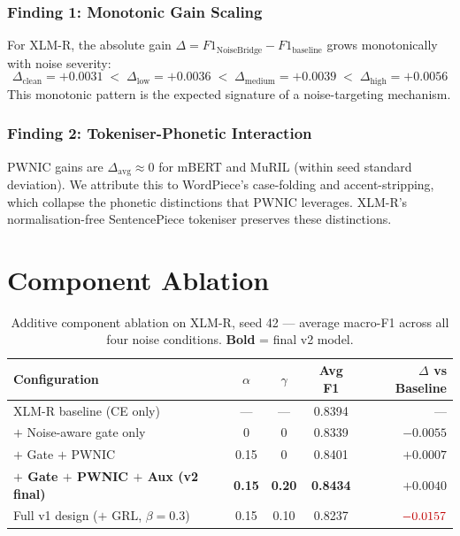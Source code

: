 \documentclass[12pt,a4paper]{report}
\begin{document}
\subsubsection{Finding 1: Monotonic Gain Scaling}
For XLM-R, the absolute gain $\Delta = F1_{\text{NoiseBridge}} - F1_{\text{baseline}}$ grows monotonically with noise severity:
\begin{equation}
  \Delta_{\text{clean}} = +0.0031 \;<\; \Delta_{\text{low}} = +0.0036 \;<\; \Delta_{\text{medium}} = +0.0039 \;<\; \Delta_{\text{high}} = +0.0056
  \label{eq:delta_monotone}
\end{equation}
This monotonic pattern is the expected signature of a noise-targeting mechanism.

\subsubsection{Finding 2: Tokeniser-Phonetic Interaction}
PWNIC gains are $\Delta_{\text{avg}} \approx 0$ for mBERT and MuRIL (within seed standard deviation). We attribute this to WordPiece's case-folding and accent-stripping, which collapse the phonetic distinctions that PWNIC leverages. XLM-R's normalisation-free SentencePiece tokeniser preserves these distinctions.

\section{Component Ablation}

\begin{table}[H]
\centering
\caption{Additive component ablation on XLM-R, seed 42 --- average macro-F1 across all four noise conditions. \textbf{Bold} = final v2 model.}
\label{tab:ablation_comp}
\small
\begin{tabular}{lcccr}
\toprule
\textbf{Configuration} & $\alpha$ & $\gamma$ & \textbf{Avg F1} & $\Delta$ vs Baseline\\
\midrule
XLM-R baseline (CE only) & --- & --- & 0.8394 & --- \\
$+$ Noise-aware gate only & 0 & 0 & 0.8339 & $-0.0055$ \\
$+$ Gate $+$ PWNIC & 0.15 & 0 & 0.8401 & $+0.0007$ \\
\textbf{$+$ Gate $+$ PWNIC $+$ Aux (v2 final)} & \textbf{0.15} & \textbf{0.20} & \textbf{0.8434} & $\mathbf{+0.0040}$ \\
Full v1 design ($+$ GRL, $\beta{=}0.3$) & 0.15 & 0.10 & 0.8237 & ${\color{codered}-0.0157}$ \\
\bottomrule
\end{tabular}
\end{table}
\end{document}
